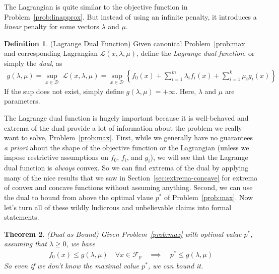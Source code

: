 \documentclass[12pt]{article}
\numberwithin{equation}{section} %
\theoremstyle{plain}
\newtheorem{thm}{Theorem}[section]
\theoremstyle{definition}
\newtheorem{defn}[thm]{Definition}
\theoremstyle{remark}
\newcommand{\sF}{\mathscr{F}}
\newcommand{\sL}{\mathscr{L}}
\begin{document}
The Lagrangian is quite similar to the objective function in
Problem~\ref{prob:linapprox}. But instead of using an infinite penalty,
it introduces a \emph{linear} penalty for some vectors $\lambda$ and
$\mu$.

\begin{defn}{(Lagrange Dual Function)}
Given canonical Problem~\ref{prob:max} and corresponding Lagrangian
$\sL(x,\lambda,\mu)$, define the \emph{Lagrange dual function}, or
simply the \emph{dual}, as
\begin{align*}
  g(\lambda,\mu) = \sup_{x\in\mathcal{D}} \; \sL(x,\lambda,\mu)
  = \sup_{x\in\mathcal{D}}
    \left\{ f_0(x)
    + \sum^m_{i=1} \lambda_i f_i(x)
    + \sum^k_{i=1} \mu_i g_i(x)
    \right\}
\end{align*}
If the sup does not exist, simply define $g(\lambda,\mu)=+\infty$.
Here, $\lambda$ and $\mu$ are parameters.
\end{defn}

The Lagrange dual function is hugely important because it is
well-behaved and extrema of the dual provide a lot of information about
the problem we really want to solve, Problem~\ref{prob:max}.  First,
while we generally have no guarantees \emph{a priori} about the shape of
the objective function or the Lagrangian (unless we impose restrictive
assumptions on $f_0$, $f_i$, and $g_i$), we will see that the Lagrange
dual function is \emph{always} convex. So we can find extrema of the
dual by applying many of the nice results that we saw in
Section~\ref{sec:extrema-concave} for extrema of convex and concave
functions without assuming anything. Second, we can use the dual to
bound from above the optimal vlaue $p^*$ of Problem~\ref{prob:max}.
Now let's turn all of these wildly ludicrous and unbelievable claims
into formal statements.

\begin{thm}{\emph{(Dual as Bound)}}
\label{thm:dual-bound}
Given Problem~\ref{prob:max} with optimal value $p^*$,
assuming that $\lambda\geq 0$, we have
\begin{align}
  f_0(x) \leq g(\lambda,\mu)
  \quad\forall x\in \sF_p
  \quad\implies\quad
  p^* \leq g(\lambda,\mu)
  \label{ineq:dual-bound}
\end{align}
So even if we don't know the maximal value $p^*$, we can bound it.
\end{thm}
\end{document}
